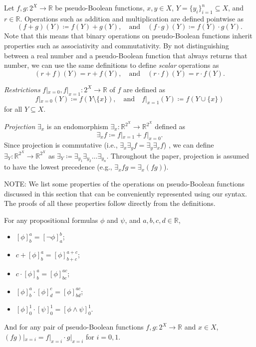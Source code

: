\documentclass[runningheads]{llncs}
\begin{document}
\begin{definition}[Operations] \label{def:operations}
  Let $f, g\colon 2^X \to \mathbb{R}$ be pseudo-Boolean functions, $x, y \in X$,
  $Y = \{y_i\}_{i=1}^n \subseteq X$, and $r \in \mathbb{R}$. Operations such as
  addition and multiplication are defined pointwise as
  \[
    (f+g)(Y) \coloneqq f(Y)+g(Y), \quad \text{and} \quad (f \cdot g)(Y)
    \coloneqq f(Y) \cdot g(Y).
  \]
  Note that this means that binary operations on pseudo-Boolean functions
  inherit properties such as associativity and commutativity. By not
  distinguishing between a real number and a pseudo-Boolean function that always
  returns that number, we can use the same definitions to define \emph{scalar}
  operations as
  \[
    (r+f)(Y) = r+f(Y), \quad \text{and} \quad (r \cdot f)(Y) = r \cdot f(Y).
  \]

  \emph{Restrictions} $f|_{x=0}, f|_{x=1}\colon 2^X \to \mathbb{R}$ of $f$ are
  defined as
  \[
    f|_{x=0}(Y) \coloneqq f(Y \setminus \{x\}), \quad \text{and} \quad
    f|_{x=1}(Y) \coloneqq f(Y \cup \{x\})
  \]
  for all $Y \subseteq X$.

  \emph{Projection} $\exists_x$ is an endomorphism $\exists_x\colon
  \mathbb{R}^{2^X} \to \mathbb{R}^{2^X}$ defined as
  \[
    \exists_xf \coloneqq f|_{x=1} + f|_{x=0}.
  \]
  Since projection is commutative (i.e., $\exists_x\exists_yf =
  \exists_y\exists_xf$) \cite{DBLP:conf/aaai/DudekPV20,DBLP:conf/cp/DudekPV20},
  we can define $\exists_Y\colon \mathbb{R}^{2^X} \to \mathbb{R}^{2^X}$ as
  $\exists_Y \coloneqq \exists_{y_1}\exists_{y_2}\dots\exists_{y_n}$. Throughout
  the paper, projection is assumed to have the lowest precedence (e.g.,
  $\exists_x fg = \exists_x (fg)$).
\end{definition}

NOTE: We list some properties of the operations on pseudo-Boolean functions
discussed in this section that can be conveniently represented using our syntax.
The proofs of all these properties follow directly from the definitions.

\begin{proposition} \label{prop:basic}
  For any propositional formulas $\phi$ and $\psi$, and $a, b, c, d \in
  \mathbb{R}$,
  \begin{itemize}
  \item $[\phi]^a_b = [\neg \phi]^b_a$;
  \item $c + [\phi]^a_b = [\phi]^{a+c}_{b+c}$;
  \item $c \cdot [\phi]^a_b = [\phi]^{ac}_{bc}$;
  \item $[\phi]^a_b \cdot [\phi]^c_d = [\phi]^{ac}_{bd}$;
  \item $[\phi]^1_0 \cdot [\psi]_0^1 = [\phi \land \psi]_0^1$.
  \end{itemize}
  And for any pair of pseudo-Boolean functions $f, g \colon 2^X \to \mathbb{R}$
  and $x \in  X$, $(fg)|_{x=i} = f|_{x=i} \cdot g|_{x=i}$ for $i = 0, 1$.
\end{proposition}
\end{document}

